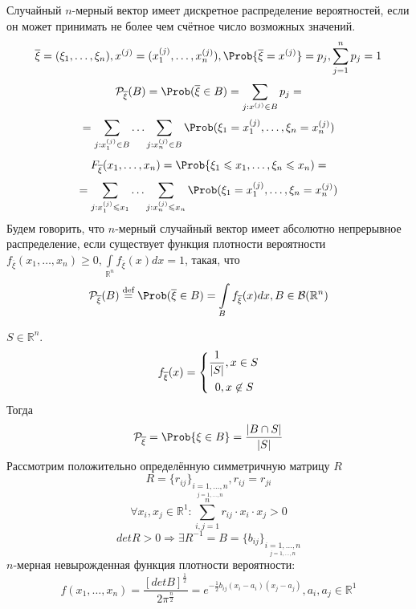 Случайный $n$-мерный вектор имеет дискретное распределение вероятностей, если он может принимать не более чем счётное число возможных значений.
\[
	\overline{\xi} = (\xi_1, \ldots, \xi_n), x^{(j)} = (x_1^{(j)}, \ldots, x_n^{(j)}), \Prob \{ \overline{\xi} = x^{(j)} \} = p_j, \sum\limits_{j=1}^n p_j = 1
\]
\[
		\mathcal{P}_{\overline{\xi}} (B) = \Prob (\overline{\xi} \in B) = \sum\limits_{j: x^{(j)} \in B} p_j =
\]
\[
	= \sum\limits_{j: x_1^{(j)} \in B} \ldots \sum\limits_{j: x_n^{(j)} \in B} \Prob (\xi_1 = x_1^{(j)}, \ldots, \xi_n = x_n^{(j)})
\]
\[ 
F_{\overline{\xi}} (x_1, \ldots, x_n) = \Prob \{ \xi_1  \leqslant x_1, \ldots, \xi_n \leqslant x_n) = \]
\[ = \sum\limits_{j: x_1^{(j)} \leqslant x_1} \ldots \sum\limits_{j: x_n^{(j)} \leqslant x_n} \Prob (\xi_1 = x_1^{(j)}, \ldots, \xi_n = x_n^{(j)})
\]
Будем говорить, что $n$-мерный случайный вектор имеет абсолютно непрерывное распределение, если существует функция плотности вероятности $f_{\overline{\xi}} (x_1, \ldots, x_n) \geqslant 0, \int\limits_{\mathbb{R}^n} f_{\overline{\xi}} (x) dx = 1$, такая, что
\[
	\mathcal{P}_{\overline{\xi}} (B) \overset{\textrm{def}}{=} \Prob (\overline{\xi} \in B) = \int\limits_B f_{\overline{\xi}} (x) dx, B \in \mathcal{B} (\mathbb{R}^n)
\]
\begin{example}
	$S \in \mathbb{R}^n$. \\
	\[
		f_{\overline{\xi}} (x) = \begin{dcases*}
 		\frac{1}{|S|}, x \in S \\
 		\;\; 0, x \not \in S
 		\end{dcases*}
	\]
	Тогда
	\[
		\mathcal{P}_{\overline{\xi}} = \Prob \{ \xi \in B \} = \frac{|B \cap S|}{|S|}
	\]
	Рассмотрим положительно определённую симметричную матрицу $R$
	\[
		R = {\{ r_{ij} \}}_{\underset{j = 1, \ldots, n}{i = 1, \ldots, n}}, r_{ij} = r_{ji}
		\]
	\[
		\forall x_i, x_j \in \mathbb{R}^1: \sum\limits_{i, j = 1}^n r_{ij} \cdot x_i \cdot x_j > 0
	\]
	\[
		det R > 0 \Rightarrow \exists R^{-1} = B = {\{ b_{ij} \}}_{\underset{j = 1, \ldots, n}{i = 1, \ldots, n}}
	\]
	$n$-мерная невырожденная функция плотности вероятности:
	\[
		f (x_1, \ldots, x_n) = \frac{{[det B]}^{\frac{1}{2}}}{2 \pi^{\frac{n}{2}}} = e^{-\frac{1}{2} b_{ij}(x_i - a_i)(x_j - a_j)}, a_i, a_j \in \mathbb{R}^1
	\]
\end{example}

\setcounter{equation}{0}
